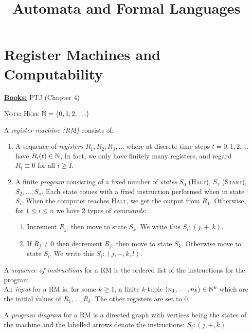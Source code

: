 \documentclass[10pt,a4paper]{article}
\title{Automata and Formal Languages}
\begin{document}
\maketitle
\section{Register Machines and Computability}
\textbf{\underline{Books:}} PTJ (Chapter 4)

\textsc{Note: Here $\mathbb{N} = \{0,1,2,\ldots\}$}

A \emph{register machine (RM)} consists of:
\begin{enumerate}
\item A sequence of \emph{registers} $R_1, R_2, R_3, \ldots$ where at discrete time steps $t = 0,1,2,\ldots$ have $R_i(t) \in \mathbb{N}$, In fact, we only have finitely many registers, and regard $R_i \equiv 0$ for all $i\geq I$.
\item A finite \emph{program} consisting of a fixed number of \emph{states} $S_0$ (\textsc{Halt}), $S_1$ (\textsc{Start}), $S_2,\ldots, S_n$. Each state comes with a fixed instruction performed when in state $S_i$. When the computer reaches \textsc{Halt}, we get the output from $R_1$. Otherwise, for $1\leq i\leq n$ we have $2$ types of \emph{commands}:
\begin{enumerate}
\item Increment $R_j$, then move to state $S_k$. We write this $S_i:(j,+,k)$.
\item If $R_j \neq 0$ then decrement $R_j$, then move to state $S_k$. Otherwise move to state $S_l$. We write this $S_i:(j,-,k,l)$.
\end{enumerate}
\end{enumerate}

A \emph{sequence of instructions} for a RM is the ordered list of the instructions for the program.\\
An \emph{input} for a RM is, for some $k\geq 1$, a finite $k$-tuple $(n_1,\ldots,n_k)\in\mathbb{N}^k$ which are the initial values of $R_1,\ldots,R_k$. The other registers are set to 0.

A \emph{program diagram} for a RM is a directed graph with vertices being the states of the machine and the labelled arrows denote the instructions: $S_i:(j,+,k) $
\end{document}
